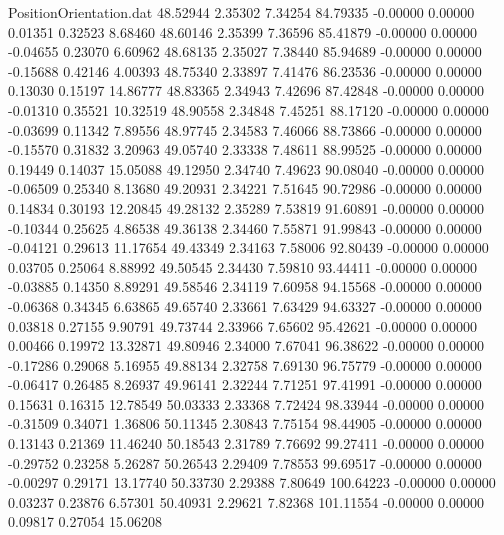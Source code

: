 \begin{filecontents}{PositionOrientation.dat}
  48.52944    2.35302    7.34254    84.79335   -0.00000    0.00000    0.01351    0.32523    8.68460
  48.60146    2.35399    7.36596    85.41879   -0.00000    0.00000   -0.04655    0.23070    6.60962
  48.68135    2.35027    7.38440    85.94689   -0.00000    0.00000   -0.15688    0.42146    4.00393
  48.75340    2.33897    7.41476    86.23536   -0.00000    0.00000    0.13030    0.15197   14.86777
  48.83365    2.34943    7.42696    87.42848   -0.00000    0.00000   -0.01310    0.35521   10.32519
  48.90558    2.34848    7.45251    88.17120   -0.00000    0.00000   -0.03699    0.11342    7.89556
  48.97745    2.34583    7.46066    88.73866   -0.00000    0.00000   -0.15570    0.31832    3.20963
  49.05740    2.33338    7.48611    88.99525   -0.00000    0.00000    0.19449    0.14037   15.05088
  49.12950    2.34740    7.49623    90.08040   -0.00000    0.00000   -0.06509    0.25340    8.13680
  49.20931    2.34221    7.51645    90.72986   -0.00000    0.00000    0.14834    0.30193   12.20845
  49.28132    2.35289    7.53819    91.60891   -0.00000    0.00000   -0.10344    0.25625    4.86538
  49.36138    2.34460    7.55871    91.99843   -0.00000    0.00000   -0.04121    0.29613   11.17654
  49.43349    2.34163    7.58006    92.80439   -0.00000    0.00000    0.03705    0.25064    8.88992
  49.50545    2.34430    7.59810    93.44411   -0.00000    0.00000   -0.03885    0.14350    8.89291
  49.58546    2.34119    7.60958    94.15568   -0.00000    0.00000   -0.06368    0.34345    6.63865
  49.65740    2.33661    7.63429    94.63327   -0.00000    0.00000    0.03818    0.27155    9.90791
  49.73744    2.33966    7.65602    95.42621   -0.00000    0.00000    0.00466    0.19972   13.32871
  49.80946    2.34000    7.67041    96.38622   -0.00000    0.00000   -0.17286    0.29068    5.16955
  49.88134    2.32758    7.69130    96.75779   -0.00000    0.00000   -0.06417    0.26485    8.26937
  49.96141    2.32244    7.71251    97.41991   -0.00000    0.00000    0.15631    0.16315   12.78549
  50.03333    2.33368    7.72424    98.33944   -0.00000    0.00000   -0.31509    0.34071    1.36806
  50.11345    2.30843    7.75154    98.44905   -0.00000    0.00000    0.13143    0.21369   11.46240
  50.18543    2.31789    7.76692    99.27411   -0.00000    0.00000   -0.29752    0.23258    5.26287
  50.26543    2.29409    7.78553    99.69517   -0.00000    0.00000   -0.00297    0.29171   13.17740
  50.33730    2.29388    7.80649   100.64223   -0.00000    0.00000    0.03237    0.23876    6.57301
  50.40931    2.29621    7.82368   101.11554   -0.00000    0.00000    0.09817    0.27054   15.06208

\end{filecontents}
